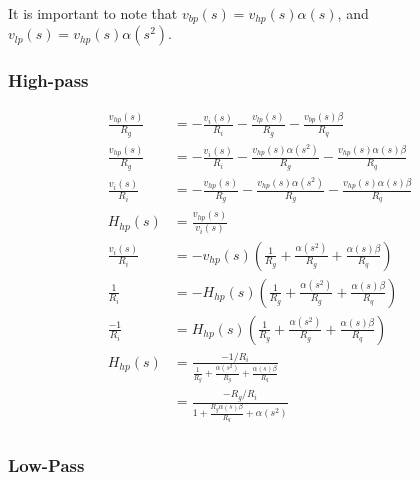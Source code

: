 \documentclass{article}
\begin{document}
It is important to note that $v_{bp}(s) = v_{hp}(s)\alpha(s)$, and $v_{lp}(s) = v_{hp}(s)\alpha(s^2)$.

\subsubsection{High-pass}

\begin{equation*}
\begin{split}
  \frac{v_{hp}(s)}{R_g} & = - \frac{v_i(s)}{R_i} - \frac{v_{lp}(s)}{R_g} - \frac{v_{bp}(s)\beta}{R_q} \\
  \frac{v_{hp}(s)}{R_g} & = - \frac{v_i(s)}{R_i} - \frac{v_{hp}(s)\alpha(s^2)}{R_g} - \frac{v_{hp}(s)\alpha(s)\beta}{R_q} \\
  \frac{v_i(s)}{R_i} & = - \frac{v_{hp}(s)}{R_g} - \frac{v_{hp}(s)\alpha(s^2)}{R_g} - \frac{v_{hp}(s)\alpha(s)\beta}{R_q} \\
  H_{hp}(s) & = \frac{v_{hp}(s)}{v_i(s)} \\
  \frac{v_i(s)}{R_i} & = - v_{hp}(s)(\frac{1}{R_g} + \frac{\alpha(s^2)}{R_g} + \frac{\alpha(s)\beta}{R_q}) \\
  \frac{1}{R_i} & = - H_{hp}(s)(\frac{1}{R_g} + \frac{\alpha(s^2)}{R_g} + \frac{\alpha(s)\beta}{R_q}) \\
  \frac{-1}{R_i} & = H_{hp}(s)(\frac{1}{R_g} + \frac{\alpha(s^2)}{R_g} + \frac{\alpha(s)\beta}{R_q}) \\
  H_{hp}(s) & = \frac{-1/R_i}{\frac{1}{R_g} + \frac{\alpha(s^2)}{R_g} + \frac{\alpha(s)\beta}{R_q}} \\
  & = \frac{-R_g/R_i}{1 + \frac{R_g\alpha(s)\beta}{R_q} + \alpha(s^2) } \\
\end{split}
\end{equation*}

\subsubsection{Low-Pass}
\end{document}
